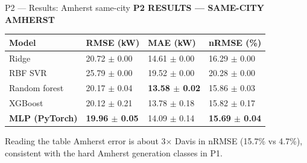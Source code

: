 \documentclass[aspectratio=169,11pt]{beamer}
\newcommand{\sectiontag}[1]{{\footnotesize\usebeamercolor[fg]{structure}\textbf{#1}}\par\vspace{0.10cm}}
\begin{document}
\begin{frame}{P2 — Results: Amherst same-city}
\sectiontag{P2 \quad RESULTS — SAME-CITY AMHERST}
\small
\begin{tabularx}{\linewidth}{@{}P{3.15cm}YYY@{}}\toprule
\textbf{Model} & \textbf{RMSE (kW)} & \textbf{MAE (kW)} & \textbf{nRMSE (\%)} \\\midrule
Ridge & 20.72 $\pm$ 0.00 & 14.61 $\pm$ 0.00 & 16.29 $\pm$ 0.00 \\
RBF SVR & 25.79 $\pm$ 0.00 & 19.52 $\pm$ 0.00 & 20.28 $\pm$ 0.00 \\
Random forest & 20.17 $\pm$ 0.04 & \textbf{13.58 $\pm$ 0.02} & 15.86 $\pm$ 0.03 \\
XGBoost & 20.12 $\pm$ 0.21 & 13.78 $\pm$ 0.18 & 15.82 $\pm$ 0.17 \\
\textbf{MLP (PyTorch)} & \textbf{19.96 $\pm$ 0.05} & 14.09 $\pm$ 0.14 & \textbf{15.69 $\pm$ 0.04} \\
\bottomrule\end{tabularx}\par
\vspace{0.25cm}
\begin{block}{Reading the table}
\footnotesize Amherst error is about 3$\times$ Davis in nRMSE (15.7\% vs 4.7\%), consistent with the hard Amherst generation classes in P1.
\end{block}
\end{frame}
\end{document}
